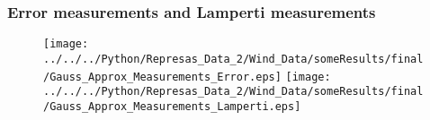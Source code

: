 \documentclass[aspectratio=169]{beamer}\usepackage[utf8]{inputenc}
\begin{document}
\begin{frame}\frametitle{Error measurements and Lamperti measurements}

\begin{figure}[ht!]
\centering
\texttt{[image: ../../../Python/Represas\_Data\_2/Wind\_Data/someResults/final/Gauss\_Approx\_Measurements\_Error.eps]}\quad
\texttt{[image: ../../../Python/Represas\_Data\_2/Wind\_Data/someResults/final/Gauss\_Approx\_Measurements\_Lamperti.eps]}
\end{figure}

\end{frame}
\end{document}
